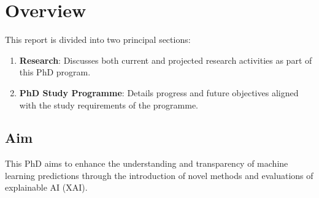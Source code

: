 \section{Overview}

This report is divided into two principal sections: 
\begin{enumerate}
    \item \textbf{Research}: Discusses both current and projected research activities as part of this PhD program.
    \item \textbf{PhD Study Programme}: Details progress and future objectives aligned with the study requirements of the programme.
\end{enumerate}

\subsection*{Aim}

This PhD aims to enhance the understanding and transparency of machine learning 
predictions through the introduction of novel methods and evaluations of explainable AI (XAI).

